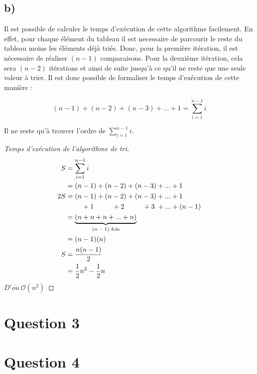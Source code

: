 \documentclass[12pt]{article}
\begin{document}
  \subsection*{b)}

    Il est possible de calculer le temps d'exécution de cette algorithme
    facilement. En effet, pour chaque élément du tableau il est necessaire de
    parcourir le reste du tableau moins les éléments déjà triés. Donc, pour la
    première itération, il est nécessaire de réaliser \( (n - 1) \) comparaisons.
    Pour la deuxième itération, cela sera \( (n - 2) \) itérations et ainsi de
    suite jusqu'à ce qu'il ne reste que une seule valeur à trier. Il est donc
    possible de formaliser le temps d'exécution de cette manière :

    \[ (n - 1) + (n - 2) + (n - 3) + ... + 1 = \sum _ {i=1} ^ {n - 1} i \]

    Il ne reste qu'à trouver l'ordre de \( \sum _ {i=1} ^ {n - 1} i \). \newpage

    \begin{proof}[Temps d'exécution de l'algorithme de tri]
      \begin{align*}
        S   &= \sum _ {i=1} ^ {n - 1} i \\
            &= (n - 1) + (n - 2) + (n - 3) + ... + 1 \\
        2S  &= (n - 1) + (n - 2) + (n - 3) + ... + 1 \\
            &\qquad\,\, + 1 \qquad\;\:\, + 2 \qquad\;\:\, + 3 \;+ ... + (n - 1) \\
            &= \underbrace{(n + n + n + ... + n)}_\textrm{\( (n - 1) \) fois} \\
            &= (n - 1)(n) \\
        S   &= \frac{n(n - 1)}{2} \\
            &= \frac{1}{2}n^2 - \frac{1}{2}n
      \end{align*}
      \( D'o\grave{u} \ \mathcal{O}(n^2) \)
    \end{proof}

  \newpage

  \section*{Question 3}

  \newpage

  \section*{Question 4}
\end{document}
